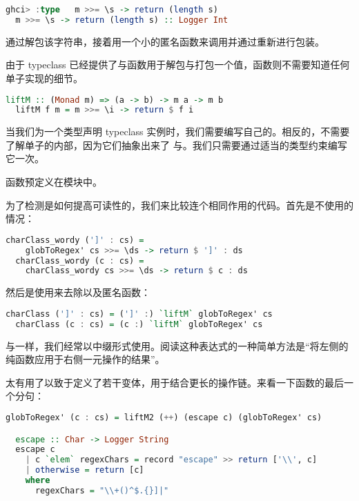 \documentclass[./main.tex]{subfiles}
\begin{document}
\begin{lstlisting}[language=Haskell]
  ghci> :type   m >>= \s -> return (length s)
  m >>= \s -> return (length s) :: Logger Int
\end{lstlisting}

通过\acode{(>>=)}解包该字符串，接着用一个小的匿名函数来调用并通过重新进行包装。

由于 typeclass 已经提供了\acode{(>>=)}与函数用于解包与打包一个值，函数则不需要知道任何单子实现的细节。

\begin{lstlisting}[language=Haskell]
  liftM :: (Monad m) => (a -> b) -> m a -> m b
  liftM f m = m >>= \i -> return $ f i
\end{lstlisting}

当我们为一个类型声明 typeclass 实例时，我们需要编写自己的。相反的，不需要了解单子的内部，因为它们抽象出来了
\acode{(>>=)}与。我们只需要通过适当的类型约束编写它一次。

函数预定义在模块中。

为了检测是如何提高可读性的，我们来比较连个相同作用的代码。首先是不使用的情况：

\begin{lstlisting}[language=Haskell]
  charClass_wordy (']' : cs) =
    globToRegex' cs >>= \ds -> return $ ']' : ds
  charClass_wordy (c : cs) =
    charClass_wordy cs >>= \ds -> return $ c : ds
\end{lstlisting}

然后是使用来去除\acode{(>>=)}以及匿名函数：

\begin{lstlisting}[language=Haskell]
  charClass (']' : cs) = (']' :) `liftM` globToRegex' cs
  charClass (c : cs) = (c :) `liftM` globToRegex' cs
\end{lstlisting}

与一样，我们经常以中缀形式使用。阅读这种表达式的一种简单方法是“将左侧的纯函数应用于右侧一元操作的结果”。

太有用了以致于定义了若干变体，用于结合更长的操作链。来看一下函数的最后一个分句：

\begin{lstlisting}[language=Haskell]
  globToRegex' (c : cs) = liftM2 (++) (escape c) (globToRegex' cs)

  escape :: Char -> Logger String
  escape c
    | c `elem` regexChars = record "escape" >> return ['\\', c]
    | otherwise = return [c]
    where
      regexChars = "\\+()^$.{}]|"
\end{lstlisting}
\end{document}

